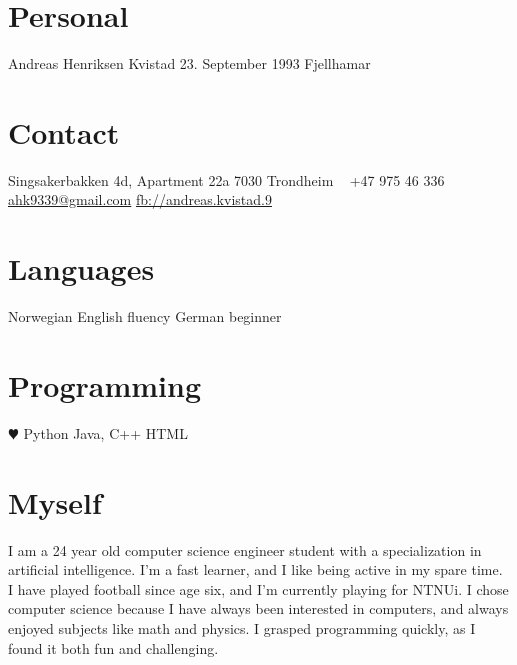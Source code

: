 \documentclass[]{friggeri-cv} %
\begin{document}


\begin{aside} %
\section{Personal}
Andreas Henriksen Kvistad
23. September 1993
Fjellhamar
\section{Contact}
Singsakerbakken 4d, Apartment 22a
7030 Trondheim
~
+47 975 46 336
~
\href{mailto:ahk9339@gmail.com}{ahk9339@gmail.com}
\href{http://facebook.com/andreas.kvistad.9}{fb://andreas.kvistad.9}
\section{Languages}
Norwegian
English fluency
German beginner
\section{Programming}
{\color{red} $\varheartsuit$} Python
Java, C++
HTML
\end{aside}



\section{Myself}
I am a 24 year old computer science engineer student with a specialization in artificial intelligence. I'm a fast learner, and I like being active in my spare time. I have played football since age six, and I'm currently playing for NTNUi. I chose computer science because I have always been interested in computers, and always enjoyed subjects like math and physics. I grasped programming quickly, as I found it both fun and challenging.


\end{document}
